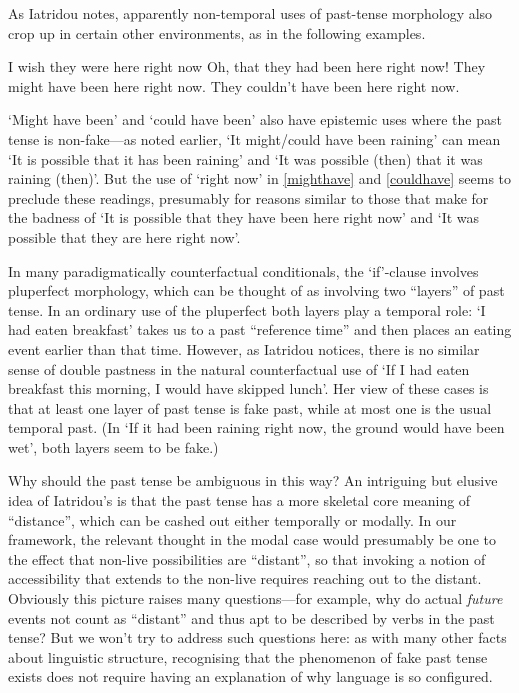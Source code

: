 \documentclass[If.tex]{subfiles}
\begin{document}
As Iatridou notes, apparently non-temporal uses of past-tense morphology also crop up in certain other environments, as in the following examples.
\begin{prop}
	\nitem 
	\begin{prop}
		\aitem
		I wish they were here right now
		\aitem 
		Oh, that they had been here right now!
		\aitem \label{mighthave}
		They might have been here right now.
		\aitem \label{couldhave}
		They couldn't have been here right now.
	\end{prop}
\end{prop}
‘Might have been’ and ‘could have been’ also have epistemic uses where the past tense is non-fake---as noted earlier, ‘It might/could have been raining’ can mean ‘It is possible that it has been raining’ and ‘It was possible (then) that it was raining (then)’. But the use of ‘right now’ in \ref{mighthave} and \ref{couldhave} seems to preclude these readings, presumably for reasons similar to those that make for the badness of ‘It is possible that they have been here right now’ and ‘It was possible that they are here right now’.


In many paradigmatically counterfactual conditionals, the ‘if’-clause involves pluperfect morphology, which can be thought of as involving two “layers” of past tense. In an ordinary use of the pluperfect both layers play a temporal role: ‘I had eaten breakfast’ takes us to a past “reference time” and then places an eating event earlier than that time. However, as Iatridou notices, there is no similar sense of double pastness in the natural counterfactual use of ‘If I had eaten breakfast this morning, I would have skipped lunch’. Her view of these cases is that at least one layer of past tense is fake past, while at most one is the usual temporal past. (In ‘If it had been raining right now, the ground would have been wet’, both layers seem to be fake.)

Why should the past tense be ambiguous in this way? An intriguing but elusive idea of Iatridou's is that the past tense has a more skeletal core meaning of “distance”, which can be cashed out either temporally or modally.  In our framework, the relevant thought in the modal case would presumably be one to the effect that non-live possibilities are “distant”, so that invoking a notion of accessibility that extends to the non-live requires reaching out to the distant. Obviously this picture raises many questions---for example, why do actual \emph{future} events not count as “distant” and thus apt to be described by verbs in the past tense? But we won't try to address such questions here: as with many other facts about linguistic structure, recognising that the phenomenon of fake past tense exists does not require having an explanation of why language is so configured.
\end{document}

